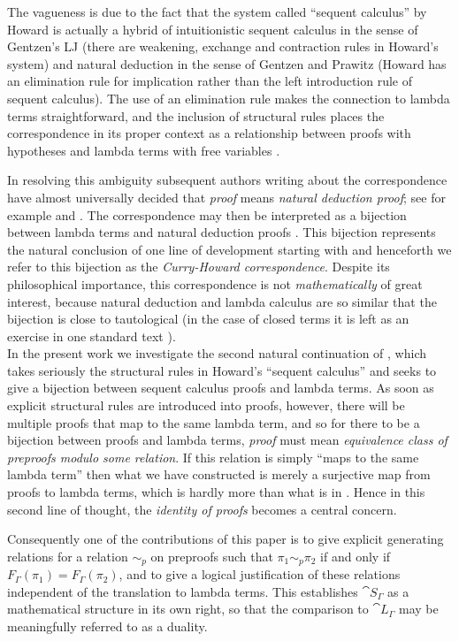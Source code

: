 \documentclass[english,letter paper,12pt,leqno]{article}
\theoremstyle{example}
\numberwithin{equation}{section}
\begin{document}
The vagueness is due to the fact that the system called ``sequent calculus'' by Howard is actually a hybrid of intuitionistic sequent calculus in the sense of Gentzen's LJ (there are weakening, exchange and contraction rules in Howard's system) and natural deduction in the sense of Gentzen \cite{gentzen} and Prawitz \cite{prawitz} (Howard has an elimination rule for implication rather than the left introduction rule of sequent calculus). The use of an elimination rule makes the connection to lambda terms straightforward, and the inclusion of structural rules places the correspondence in its proper context as a relationship between proofs with hypotheses and lambda terms with free variables \cite[\S 3]{howard}.

In resolving this ambiguity subsequent authors writing about the correspondence have almost universally decided that \emph{proof} means \emph{natural deduction proof}; see for example \cite[\S 4.8,\S 7.4, \S 7.6]{sorensen} and \cite{wadler}. The correspondence may then be interpreted as a bijection between lambda terms and natural deduction proofs \cite[\S 6.5]{selinger}. This bijection represents the natural conclusion of one line of development starting with \cite{howard} and henceforth we refer to this bijection as the \emph{Curry-Howard correspondence}. Despite its philosophical importance, this correspondence is not \emph{mathematically} of great interest, because natural deduction and lambda calculus are so similar that the bijection is close to tautological (in the case of closed terms it is left as an exercise in one standard text \cite[Ex. 4.8]{sorensen}). 
\\

In the present work we investigate the second natural continuation of \cite{howard}, which takes seriously the structural rules in Howard's ``sequent calculus'' and seeks to give a bijection between sequent calculus proofs and lambda terms. As soon as explicit structural rules are introduced into proofs, however, there will be multiple proofs that map to the same lambda term, and so for there to be a bijection between proofs and lambda terms, \emph{proof} must mean \emph{equivalence class of preproofs modulo some relation}. If this relation is simply ``maps to the same lambda term'' then what we have constructed is merely a surjective map from proofs to lambda terms, which is hardly more than what is in \cite{howard}. Hence in this second line of thought, the \emph{identity of proofs} becomes a central concern. 

Consequently one of the contributions of this paper is to give explicit generating relations for a relation $\sim_p$ on preproofs such that $\pi_1 \sim_p \pi_2$ if and only if $F_\Gamma(\pi_1) = F_\Gamma(\pi_2)$, and to give a logical justification of these relations independent of the translation to lambda terms. This establishes $\cat{S}_\Gamma$ as a mathematical structure in its own right, so that the comparison to $\cat{L}_\Gamma$ may be meaningfully referred to as a duality. 
\\
\end{document}
